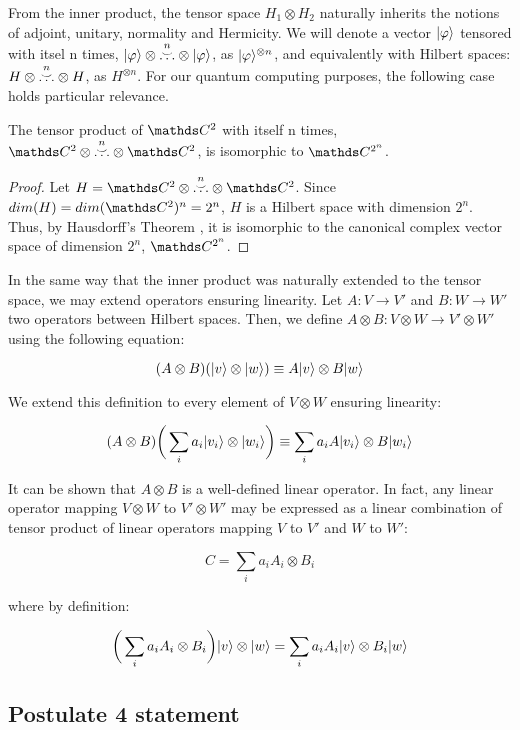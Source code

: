 From the inner product, the tensor space $H_1 \otimes H_2$ naturally inherits the notions of adjoint, unitary, normality and Hermicity. We will denote a vector $|\varphi\rangle$ tensored with itsel n times, $|\varphi\rangle \otimes \overset{\substack{n\\\smile}}{\dotsc} \otimes |\varphi\rangle$, as $|\varphi\rangle^{\otimes n}$, and equivalently with Hilbert spaces: $H \otimes \overset{\substack{n\\\smile}}{\dotsc} \otimes H$, as $H^{\otimes n}$. For our quantum computing purposes, the following case holds particular relevance.

\begin{corollary}
	The tensor product of $\C^2$ with itself n times, $\C^2 \otimes \overplace{n}{\dotsc} \otimes \C^2$, is isomorphic to $\C^{2^n}$.
\end{corollary}

\begin{proof}
	Let $H = \C^2 \otimes \overplace{n}{\dotsc} \otimes \C^2$. Since $dim(H) = dim(\C^2)^n = 2^n$, $H$ is a Hilbert space with dimension $2^n$. Thus, by Hausdorff's Theorem \cite{Paya2020}, it is isomorphic to the canonical complex vector space of dimension $2^n$, $\C^{2^n}$.
\end{proof}

In the same way that the inner product was naturally extended to the tensor space, we may extend operators ensuring linearity. Let $A: V \longrightarrow V'$ and $B: W \longrightarrow W'$ two operators between Hilbert spaces. Then, we define $A \otimes B: V \otimes W \longrightarrow V' \otimes W'$ using the following equation:

$$ (A \otimes B)(|v\rangle \otimes |w\rangle) \equiv A|v\rangle \otimes B|w\rangle $$

We extend this definition to every element of $V \otimes W$ ensuring linearity:

$$ (A \otimes B) \bigg(\sum_i a_i |v_i\rangle \otimes |w_i\rangle \bigg) \equiv \sum_i a_i A|v_i\rangle \otimes B|w_i\rangle $$

It can be shown that $A \otimes B$ is a well-defined linear operator. In fact, any linear operator mapping $V \otimes W$ to $V' \otimes W'$ may be expressed as a linear combination of tensor product of linear operators mapping $V$ to $V'$ and $W$ to $W'$:

$$ C = \sum_i a_i A_i \otimes B_i $$

where by definition:

$$ \bigg( \sum_i a_i A_i \otimes B_i \bigg)|v\rangle \otimes |w\rangle = \sum_i a_i A_i|v\rangle \otimes B_i|w\rangle $$


\subsection{Postulate 4 statement}
\label{postulate-4-section}

